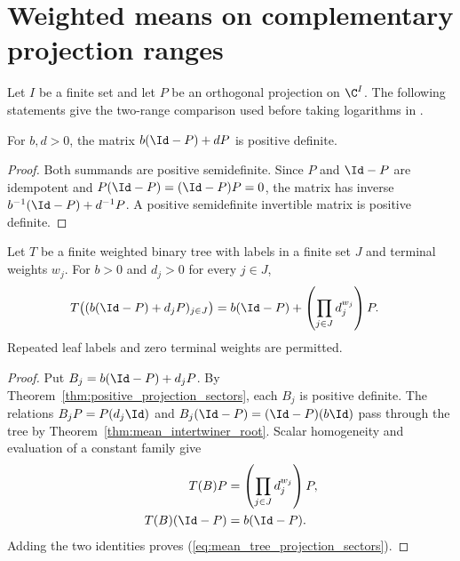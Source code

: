 \section{Weighted means on complementary projection ranges}
\label{sec:mean_tree_projection_sectors}

Let $I$ be a finite set and let $P$ be an orthogonal projection on $\C^I$.
The following statements give the two-range comparison used before
taking logarithms in
\cite[lines~603--621 of the norm-comparison argument]{OpenAI2026AreaLaw}.

\begin{theorem}
\label{thm:positive_projection_sectors}
\leanok
For $b,d>0$, the matrix $b(\Id-P)+dP$ is positive definite.
\end{theorem}
\begin{proof}
\leanok
Both summands are positive semidefinite. Since $P$ and $\Id-P$ are
idempotent and $P(\Id-P)=(\Id-P)P=0$, the matrix has inverse
$b^{-1}(\Id-P)+d^{-1}P$. A positive semidefinite invertible matrix is
positive definite.
\end{proof}

\begin{theorem}
\label{thm:mean_tree_projection_sectors}
\leanok
{}
Let $T$ be a finite weighted binary tree with labels in a finite set $J$
and terminal weights $w_j$. For $b>0$ and $d_j>0$ for every $j\in J$,
\begin{align}
 T\bigl((b(\Id-P)+d_jP)_{j\in J}\bigr)
 &=b(\Id-P)+\left(\prod_{j\in J}d_j^{w_j}\right)P.
 \label{eq:mean_tree_projection_sectors}
\end{align}
Repeated leaf labels and zero terminal weights are permitted.
\end{theorem}
\begin{proof}
\leanok
{}
Put $B_j=b(\Id-P)+d_jP$. By
Theorem~\ref{thm:positive_projection_sectors}, each $B_j$ is positive
definite. The relations $B_jP=P(d_j\Id)$ and
$B_j(\Id-P)=(\Id-P)(b\Id)$ pass through the tree by
Theorem~\ref{thm:mean_intertwiner_root}. Scalar homogeneity and evaluation
of a constant family give
\begin{align}
 T(B)P&=\left(\prod_{j\in J}d_j^{w_j}\right)P,\notag\\
 T(B)(\Id-P)&=b(\Id-P).\notag
\end{align}
Adding the two identities proves (\ref{eq:mean_tree_projection_sectors}).
\end{proof}

